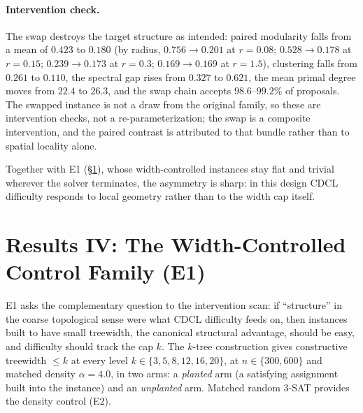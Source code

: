\documentclass[pdflatex,sn-basic,Numbered]{sn-jnl}
\begin{document}
\paragraph{Intervention check.}
The swap destroys the target structure as intended: paired modularity
falls from a mean of $0.423$ to $0.180$ (by radius, $0.756\to0.201$ at
$r{=}0.08$; $0.528\to0.178$ at $r{=}0.15$; $0.239\to0.173$ at $r{=}0.3$;
$0.169\to0.169$ at $r{=}1.5$), clustering falls from $0.261$ to $0.110$,
the spectral gap rises from $0.327$ to $0.621$, the mean primal degree
moves from $22.4$ to $26.3$, and the swap chain accepts $98.6$--$99.2\%$
of proposals. The swapped instance is not a draw from the original
family, so these are intervention checks, not a re-parameterization; the
swap is a composite intervention, and the paired contrast is attributed to
that bundle rather than to spatial locality alone.

Together with E1 (\S\ref{sec:e1}), whose width-controlled instances stay
flat and trivial wherever the solver terminates, the asymmetry is sharp: in
this design CDCL difficulty responds to local geometry rather than to the
width cap itself.

\section{Results IV: The Width-Controlled Control Family (E1)}
\label{sec:e1}

E1 asks the complementary question to the intervention scan: if
``structure'' in the coarse topological sense were what CDCL difficulty
feeds on, then instances built to have small treewidth, the canonical
structural advantage, should be easy, and difficulty should track the
cap $k$. The $k$-tree construction gives constructive treewidth $\le k$ at
every level $k \in \{3,5,8,12,16,20\}$, at $n \in \{300,600\}$ and matched
density $\alpha = 4.0$, in two arms: a \emph{planted} arm (a satisfying
assignment built into the instance) and an \emph{unplanted} arm. Matched
random 3-SAT provides the density control (E2).
\end{document}
